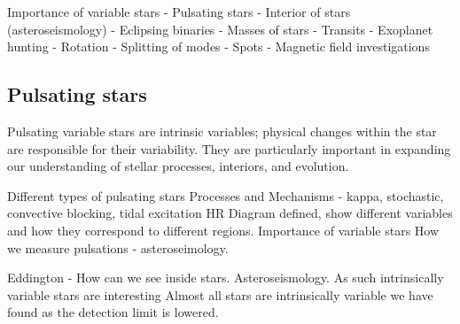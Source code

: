 Importance of variable stars
    - Pulsating stars
        - Interior of stars (asteroseismology)
    - Eclipsing binaries
        - Masses of stars
    - Transits
        - Exoplanet hunting
    - Rotation
        - Splitting of modes
        - Spots
        - Magnetic field investigations

\subsection{Pulsating stars}

Pulsating variable stars are intrinsic variables; physical changes within the star are responsible for their variability. They are particularly important in expanding our understanding of stellar processes, interiors, and evolution.



Different types of pulsating stars
Processes and Mechanisms - kappa, stochastic, convective blocking, tidal excitation
HR Diagram defined, show different variables and how they correspond to different regions.
Importance of variable stars
How we measure pulsations - asteroseimology.

Eddington - How can we see inside stars.
Asteroseismology. As such intrinsically variable stars are interesting
Almost all stars are intrinsically variable we have found as the detection limit is lowered.






